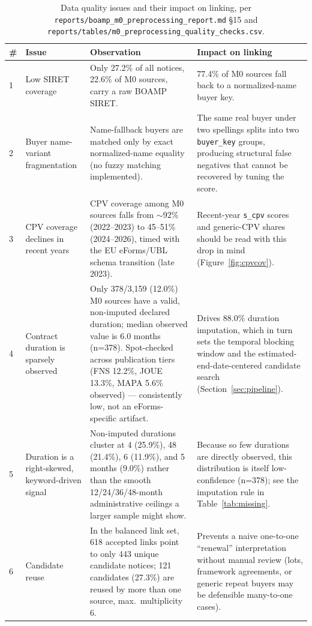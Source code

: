 \documentclass[11pt]{article}
\begin{document}
\begin{table}[h!]
\centering
\caption{Data quality issues and their impact on linking, per
\texttt{reports/boamp\_m0\_preprocessing\_report.md} \S15 and
\texttt{reports/tables/m0\_preprocessing\_quality\_checks.csv}.}
\small
\begin{tabular}{p{}p{}p{}p{}}
\toprule
\# & Issue & Observation & Impact on linking \\
\midrule
1 & Low SIRET coverage & Only 27.2\% of all notices, 22.6\% of M0 sources, carry a raw BOAMP SIRET. & 77.4\% of M0 sources fall back to a normalized-name buyer key. \\
2 & Buyer name-variant fragmentation & Name-fallback buyers are matched only by exact normalized-name equality (no fuzzy matching implemented). & The same real buyer under two spellings splits into two \texttt{buyer\_key} groups, producing structural false negatives that cannot be recovered by tuning the score. \\
3 & CPV coverage declines in recent years & CPV coverage among M0 sources falls from $\sim$92\% (2022--2023) to 45--51\% (2024--2026), timed with the EU eForms/UBL schema transition (late 2023). & Recent-year \texttt{s\_cpv} scores and generic-CPV shares should be read with this drop in mind (Figure~\ref{fig:cpvcov}). \\
4 & Contract duration is sparsely observed & Only 378/3{,}159 (12.0\%) M0 sources have a valid, non-imputed declared duration; median observed value is 6.0 months (n=378). Spot-checked across publication tiers (FNS 12.2\%, JOUE 13.3\%, MAPA 5.6\% observed) --- consistently low, not an eForms-specific artifact. & Drives 88.0\% duration imputation, which in turn sets the temporal blocking window and the estimated-end-date-centered candidate search (Section~\ref{sec:pipeline}). \\
5 & Duration is a right-skewed, keyword-driven signal & Non-imputed durations cluster at 4 (25.9\%), 48 (21.4\%), 6 (11.9\%), and 5 months (9.0\%) rather than the smooth 12/24/36/48-month administrative ceilings a larger sample might show. & Because so few durations are directly observed, this distribution is itself low-confidence (n=378); see the imputation rule in Table~\ref{tab:missing}. \\
6 & Candidate reuse & In the balanced link set, 618 accepted links point to only 443 unique candidate notices; 121 candidates (27.3\%) are reused by more than one source, max.\ multiplicity 6. & Prevents a naive one-to-one ``renewal'' interpretation without manual review (lots, framework agreements, or generic repeat buyers may be defensible many-to-one cases). \\

\end{tabular}
\end{table}
\end{document}
